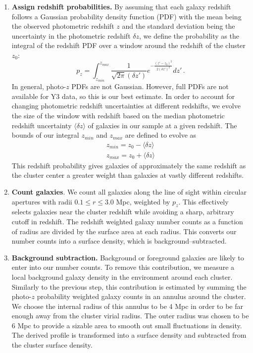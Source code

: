 \begin{enumerate}
\item {\bf Assign redshift probabilities. } By assuming that each galaxy redshift follows a Gaussian probability density function (PDF) with the mean being the observed photometric redshift $z$ and the standard deviation being the uncertainty in the photometric redshift $\delta z$, we define the probability as the integral of the redshift PDF over a window around the redshift of the cluster $z_0$:
\begin{equation}
p_z=\int_{z_{min}}^{z_{max}} \frac{1}{\sqrt{2\pi}(\delta z')}e^{-\frac{(z'-z_{0})^2}{2 (\delta z') ^2}}dz'\, .
\end{equation}
In general, photo-$z$ PDFs are not Gaussian. However, full PDFs are not available for Y3 data, so this is our best estimate.
In order to account for changing photometric redshift uncertainties at different redshifts, we evolve the size of the window with redshift based on the median photometric redshift uncertainty $\langle \delta z \rangle$ of galaxies in our sample at a given redshift. The bounds of our integral $z_{min}$ and $z_{max}$ are defined to evolve as  
\begin{gather}
\nonumber z_{min}=z_{0}-\langle \delta z \rangle \\
z_{max}=z_{0}+\langle \delta z \rangle
\end{gather}
This redshift probability gives galaxies of approximately the same redshift as the cluster center a greater weight than galaxies at vastly different redshifts. 

\item {\bf Count galaxies}. We count all galaxies along the line of sight within circular apertures with radii $0.1\leq r \leq 3.0$ Mpc, weighted by $p_z$. This effectively selects galaxies near the cluster redshift while avoiding a sharp, arbitrary cutoff in redshift. The redshift weighted galaxy number counts as a function of radius are divided by the surface area at each radius. This converts our number counts into a surface density, which is background--subtracted. 

\item {\bf Background subtraction. } Background or foreground galaxies are likely to enter into our number counts. To remove this contribution, we measure a local background galaxy density in the environment around each cluster. Similarly to the previous step, this contribution is estimated by summing the photo-$z$ probability weighted galaxy counts in an annulus around the cluster. We choose the internal radius of this annulus to be 4 Mpc in order to be far enough away from the cluster virial radius. The outer radius was chosen to be 6 Mpc to provide a sizable area to smooth out small fluctuations in density. The derived profile is transformed into a surface density and subtracted from the cluster surface density.


\end{enumerate}
